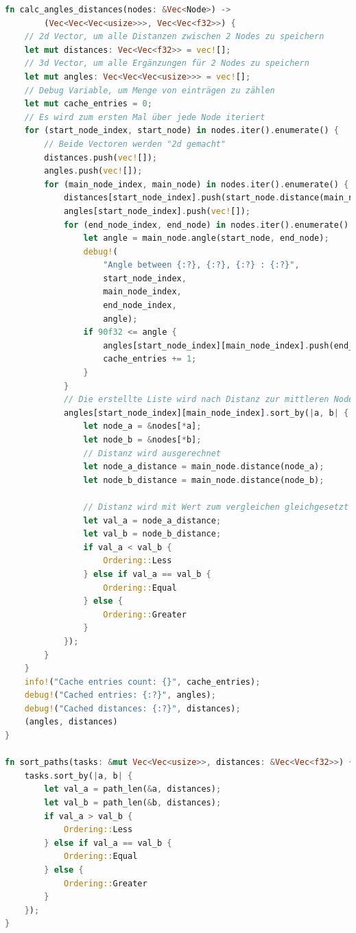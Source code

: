 \documentclass[a4paper,10pt,ngerman]{scrartcl}
\begin{document}
\begin{lstlisting}[language=Rust]
fn calc_angles_distances(nodes: &Vec<Node>) -> 
        (Vec<Vec<Vec<usize>>>, Vec<Vec<f32>>) { 
    // 2d Vector, um alle Distanzen zwischen 2 Nodes zu speichern
    let mut distances: Vec<Vec<f32>> = vec![];
    // 3d Vector, um alle Ergänzungen für 2 Nodes zu speichern
    let mut angles: Vec<Vec<Vec<usize>>> = vec![];
    // Debug Variable, um Menge von einträgen zu zählen
    let mut cache_entries = 0;
    // Es wird zum ersten Mal über jede Node iteriert 
    for (start_node_index, start_node) in nodes.iter().enumerate() {
        // Beide Vectoren werden "2d gemacht"
        distances.push(vec![]);
        angles.push(vec![]);
        for (main_node_index, main_node) in nodes.iter().enumerate() {
            distances[start_node_index].push(start_node.distance(main_node));
            angles[start_node_index].push(vec![]);
            for (end_node_index, end_node) in nodes.iter().enumerate() {
                let angle = main_node.angle(start_node, end_node);
                debug!(
                    "Angle between {:?}, {:?}, {:?} : {:?}", 
                    start_node_index, 
                    main_node_index, 
                    end_node_index, 
                    angle);
                if 90f32 <= angle {
                    angles[start_node_index][main_node_index].push(end_node_index);
                    cache_entries += 1;
                }
            }
            // Die erstellte Liste wird nach Distanz zur mittleren Node sortiert
            angles[start_node_index][main_node_index].sort_by(|a, b| {
                let node_a = &nodes[*a]; 
                let node_b = &nodes[*b];
                // Distanz wird ausgerechnet
                let node_a_distance = main_node.distance(node_a);
                let node_b_distance = main_node.distance(node_b);
    
                // Distanz wird mit Wert zum vergleichen gleichgesetzt
                let val_a = node_a_distance;
                let val_b = node_b_distance;
                if val_a < val_b {
                    Ordering::Less
                } else if val_a == val_b {
                    Ordering::Equal
                } else {
                    Ordering::Greater
                }
            });
        }
    }
    info!("Cache entries count: {}", cache_entries);
    debug!("Cached entries: {:?}", angles);
    debug!("Cached distances: {:?}", distances);
    (angles, distances)
}

fn sort_paths(tasks: &mut Vec<Vec<usize>>, distances: &Vec<Vec<f32>>) {
    tasks.sort_by(|a, b| {
        let val_a = path_len(&a, distances);
        let val_b = path_len(&b, distances);
        if val_a > val_b {
            Ordering::Less
        } else if val_a == val_b {
            Ordering::Equal
        } else {
            Ordering::Greater
        }
    });
}


\end{lstlisting}
\end{document}
